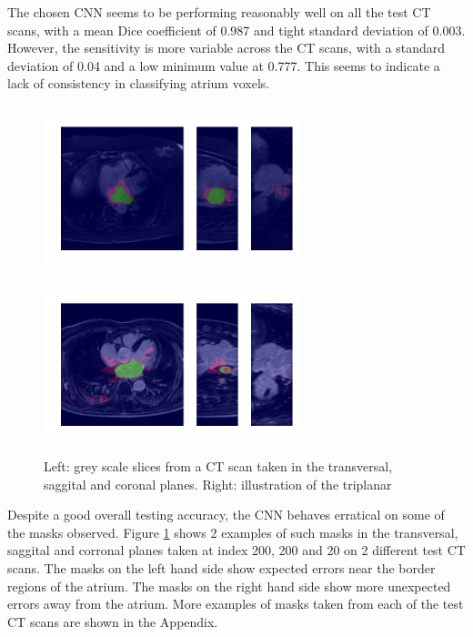 \noindent The chosen CNN seems to be performing reasonably well on all the test CT scans, with a mean Dice coefficient of 0.987 and tight standard deviation of 0.003. However, the sensitivity is more variable across the CT scans, with a standard deviation of 0.04 and a low minimum value at 0.777. This seems to indicate a lack of consistency in classifying atrium voxels.\\

\begin{figure}
\centering
\begin{minipage}{0.45\textwidth}
\centering
\includegraphics[trim=0cm 2cm 0cm 2cm, clip=true, height=50mm, width=75mm]{Chapter3/img/Masks_for_14022801.png}
\end{minipage}\hfill
\begin{minipage}{0.45\textwidth}
\centering
\includegraphics[trim=0cm 2cm 0cm 2cm, clip=true, height=50mm, width=75mm]{Chapter3/img/Masks_for_14012303.png}
\end{minipage}
\caption{Left: grey scale slices from a CT scan taken in the transversal, saggital and coronal planes. Right: illustration of the triplanar}
\label{final_model}
\end{figure}

\noindent Despite a good overall testing accuracy, the CNN behaves erratical on some of the masks observed. Figure \ref{final_model} shows 2 examples of such masks in the transversal, saggital and corronal planes taken at index 200, 200 and 20 on 2 different test CT scans. The masks on the left hand side show expected errors near the border regions of the atrium. The masks on the right hand side show more unexpected errors away from the atrium. More examples of masks taken from each of the test CT scans are shown in the Appendix.




















